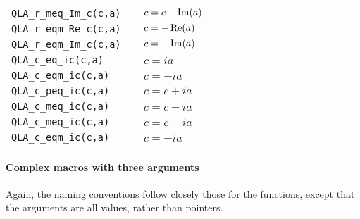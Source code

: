 \documentclass{article}
\renewcommand{\Re}{\mathop{\rm Re}}
\renewcommand{\Im}{\mathop{\rm Im}}
\begin{document}
\begin{center}
\begin{tabular}{|l|l|}
\verb|QLA_r_meq_Im_c(c,a)  | & $ c = c -  \Im(a)                $ \\
\verb|QLA_r_eqm_Re_c(c,a)  | & $ c =- \Re(a)                    $ \\
\verb|QLA_r_eqm_Im_c(c,a)  | & $ c =- \Im(a)                    $ \\
\verb|QLA_c_eq_ic(c,a)     | & $ c = ia                         $ \\
\verb|QLA_c_eqm_ic(c,a)    | & $ c = -ia                        $ \\
\verb|QLA_c_peq_ic(c,a)    | & $ c = c +  ia                    $ \\
\verb|QLA_c_meq_ic(c,a)    | & $ c = c -  ia                    $ \\
\verb|QLA_c_meq_ic(c,a)    | & $ c = c -  ia                    $ \\
\verb|QLA_c_eqm_ic(c,a)    | & $ c = -ia                        $ \\
\hline
\end{tabular}
\end{center}

\newpage
\paragraph{Complex macros with three arguments}

Again, the naming conventions follow closely those for the functions,
except that the arguments are all values, rather than pointers.
\end{document}
